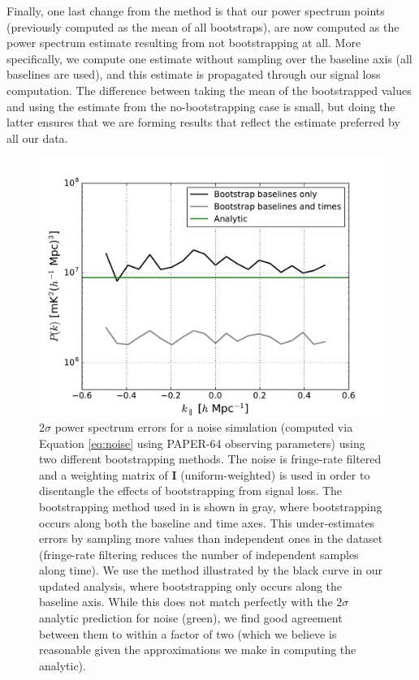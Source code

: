 \documentclass[preprint2,numberedappendix,tighten]{aastex6}
\begin{document}
Finally, one last change from the  method is that our power spectrum points (previously computed as the mean of all bootstraps), are now computed as the power spectrum estimate resulting from not bootstrapping at all. More specifically, we compute one estimate without sampling over the baseline axis (all baselines are used), and this estimate is propagated through our signal loss computation. The difference between taking the mean of the bootstrapped values and using the estimate from the no-bootstrapping case is small, but doing the latter ensures that we are forming results that reflect the estimate preferred by all our data.

\begin{figure}
	\centering
	\includegraphics[trim={0.3cm 0cm 0.3cm 0.3cm},width=\columnwidth]{plots/noise_errors.pdf}
	\caption{$2\sigma$ power spectrum errors for a noise simulation (computed via Equation \eqref{eq:noise} using PAPER-64 observing parameters) using two different bootstrapping 
methods. The noise is fringe-rate filtered and a weighting matrix of $\textbf{I}$ (uniform-weighted) is used in order to disentangle the 
effects of bootstrapping from signal loss. The bootstrapping method used in  is shown in gray, where bootstrapping occurs along both the baseline and time axes. This under-estimates errors by sampling more values than independent ones in the dataset (fringe-rate filtering reduces the number of independent samples along time). We use the method illustrated by the black curve in our updated analysis, where bootstrapping only occurs along the baseline axis. While this does not match perfectly with the $2\sigma$ analytic prediction for noise (green), we find good agreement between them to within a factor of two (which we believe is reasonable given the approximations we make in computing the analytic).}
	\label{fig:data_errors}
\end{figure}
\end{document}
